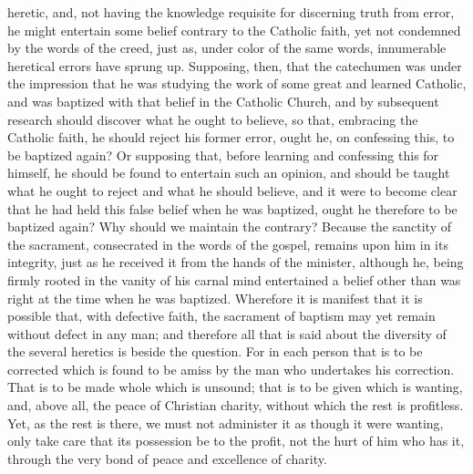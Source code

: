 heretic, and, not having the knowledge requisite for discerning truth from error, he might entertain some belief contrary to the Catholic faith, yet not condemned by the words of the creed, just as, under color of the same words, innumerable heretical errors have sprung up. Supposing, then, that the catechumen was under the impression that he was studying the work of some great and learned Catholic, and was baptized with that belief in the Catholic Church, and by subsequent research should discover what he ought to believe, so that, embracing the Catholic faith, he should reject his former error, ought he, on confessing this, to be baptized again? Or supposing that, before learning and confessing this for himself, he should be found to entertain such an opinion, and should be taught what he ought to reject and what he should believe, and it were to become clear that he had held this false belief when he was baptized, ought he therefore to be baptized again? Why should we maintain the contrary? Because the sanctity of the sacrament, consecrated in the words of the gospel, remains upon him in its integrity, just as he received it from the hands of the minister, although he, being firmly rooted in the vanity of his carnal mind entertained a belief other than was right at the time when he was baptized. Wherefore it is manifest that it is possible that, with defective faith, the sacrament of baptism may yet remain without defect in any man; and therefore all that is said about the diversity of the several heretics is beside the question. For in each person that is to be corrected which is found to be amiss by the man who undertakes his correction. That is to be made whole which is unsound; that is to be given which is wanting, and, above all, the peace of Christian charity, without which the rest is profitless. Yet, as the rest is there, we must not administer it as though it were wanting, only take care that its possession be to the profit, not the hurt of him who has it, through the very bond of peace and excellence of charity.


